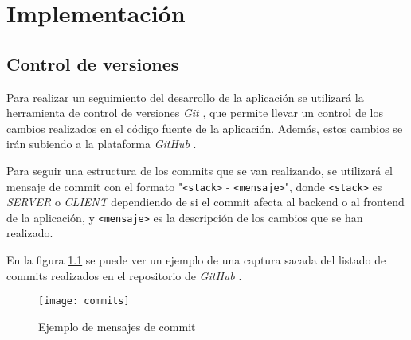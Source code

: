 \chapter{Implementación}

\section{Control de versiones}
Para realizar un seguimiento del desarrollo de la aplicación se utilizará la
herramienta de control de versiones \textit{Git} \cite{git}, que permite llevar un
control de los cambios realizados en el código fuente de la aplicación. Además, estos
cambios se irán subiendo a la plataforma \textit{GitHub} \cite{github}.

Para seguir una estructura de los commits que se van realizando, se utilizará
el mensaje de commit con el formato "\texttt{<stack>} - \texttt{<mensaje>}", donde \texttt{<stack>}
es \textit{SERVER} o \textit{CLIENT} dependiendo de si el commit afecta al backend o
al frontend de la aplicación, y \texttt{<mensaje>} es la descripción de los cambios que
se han realizado.

En la figura \ref{fig:commits} se puede ver un ejemplo de una captura sacada
del listado de commits realizados en el repositorio de \textit{GitHub} \cite{github}.

\begin{figure}[H]
  \centering
  \texttt{[image: commits]}
  \caption{Ejemplo de mensajes de commit}
  \label{fig:commits}
\end{figure}
